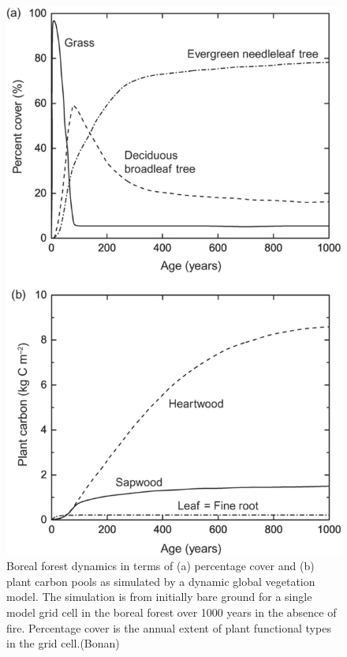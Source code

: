 \documentclass[12pt,oneside]{book}
\begin{document}
\begin{figure}

{\centering \includegraphics[width=0.8\linewidth]{figures/chap6/f67_DGM_boreal_succession} 

}

\caption{Boreal forest dynamics in terms of (a) percentage cover and (b) plant carbon pools as simulated by a dynamic global vegetation model. The simulation is from initially bare ground for a single model grid cell in the boreal forest over 1000 years in the absence of fire. Percentage cover is the annual extent of plant functional types in the grid cell.(Bonan)}\label{fig:f67}
\end{figure}
\end{document}
